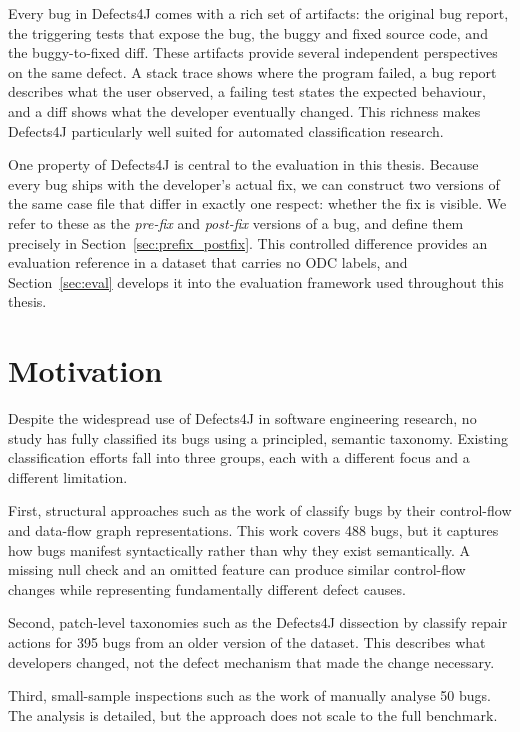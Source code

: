 \documentclass{iutbscthesis}
\begin{document}
Every bug in Defects4J comes with a rich set of artifacts: the original bug report, the triggering tests that expose the bug, the buggy and fixed source code, and the buggy-to-fixed diff. These artifacts provide several independent perspectives on the same defect. A stack trace shows where the program failed, a bug report describes what the user observed, a failing test states the expected behaviour, and a diff shows what the developer eventually changed. This richness makes Defects4J particularly well suited for automated classification research.

One property of Defects4J is central to the evaluation in this thesis. Because every bug ships with the developer's actual fix, we can construct two versions of the same case file that differ in exactly one respect: whether the fix is visible. We refer to these as the \emph{pre-fix} and \emph{post-fix} versions of a bug, and define them precisely in Section~\ref{sec:prefix_postfix}. This controlled difference provides an evaluation reference in a dataset that carries no ODC labels, and Section~\ref{sec:eval} develops it into the evaluation framework used throughout this thesis.

\section{Motivation}

Despite the widespread use of Defects4J in software engineering research, no study has fully classified its bugs using a principled, semantic taxonomy. Existing classification efforts fall into three groups, each with a different focus and a different limitation.

First, structural approaches such as the work of \textcite{vanderspuy2025anatomy} classify bugs by their control-flow and data-flow graph representations. This work covers 488 bugs, but it captures how bugs manifest syntactically rather than why they exist semantically. A missing null check and an omitted feature can produce similar control-flow changes while representing fundamentally different defect causes.

Second, patch-level taxonomies such as the Defects4J dissection by \textcite{sobreira2018dissection} classify repair actions for 395 bugs from an older version of the dataset. This describes what developers changed, not the defect mechanism that made the change necessary.

Third, small-sample inspections such as the work of \textcite{jiang2019manual} manually analyse 50 bugs. The analysis is detailed, but the approach does not scale to the full benchmark.
\end{document}
